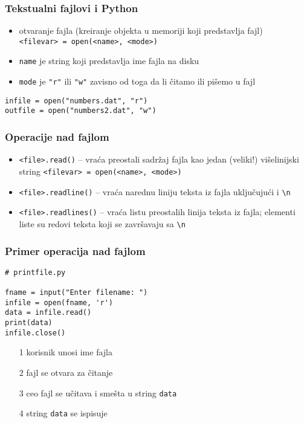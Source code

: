 \documentclass[utf8,compress]{beamer}
\begin{document}
\begin{frame}[fragile]
  \frametitle{Tekstualni fajlovi i Python}
  \begin{itemize}
    \item otvaranje fajla (kreiranje objekta u memoriji koji predstavlja fajl) \\
      \texttt{<filevar> = open(<name>, <mode>)}
    \item \texttt{name} je string koji predstavlja ime fajla na disku
    \item \texttt{mode} je \texttt{"r"} ili \texttt{"w"} zavisno od toga da li čitamo ili pišemo u fajl
  \end{itemize}
\begin{verbatim}
infile = open("numbers.dat", "r")
outfile = open("numbers2.dat", "w")
\end{verbatim}
\end{frame}

\begin{frame}[fragile]
  \frametitle{Operacije nad fajlom}
  \begin{itemize}
    \item \texttt{<file>.read()} -- vraća preostali sadržaj fajla kao jedan (veliki!) višelinijski string
      \texttt{<filevar> = open(<name>, <mode>)}
    \item \texttt{<file>.readline()} -- vraća narednu liniju teksta iz fajla uključujući i \texttt{\textbackslash n}
    \item \texttt{<file>.readlines()} -- vraća listu preostalih linija teksta iz fajla; elementi liste su redovi teksta koji se završavaju sa \texttt{\textbackslash n}
  \end{itemize}
\end{frame}

\begin{frame}[fragile]
  \frametitle{Primer operacija nad fajlom}
\begin{verbatim}
# printfile.py

fname = input("Enter filename: ")
infile = open(fname, 'r')
data = infile.read()
print(data)
infile.close()
\end{verbatim}
  \begin{itemize}
    \item[1] korisnik unosi ime fajla
    \item[2] fajl se otvara za čitanje
    \item[3] ceo fajl se učitava i smešta u string \texttt{data}
    \item[4] string \texttt{data} se ispisuje
  \end{itemize}
\end{frame}
\end{document}
